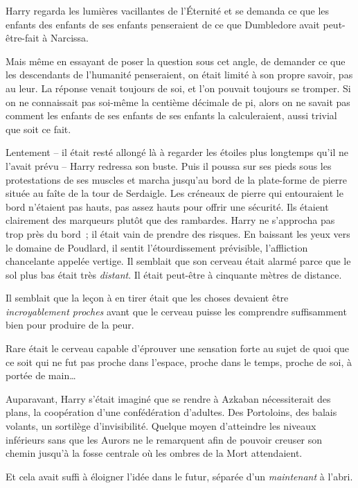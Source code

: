 Harry regarda les lumières vacillantes de l'Éternité et se demanda ce que les enfants des enfants de ses enfants penseraient de ce que Dumbledore avait peut-être-fait à Narcissa.

Mais même en essayant de poser la question sous cet angle, de demander ce que les descendants de l'humanité penseraient, on était limité à son propre savoir, pas au leur. La réponse venait toujours de soi, et l'on pouvait toujours se tromper. Si on ne connaissait pas soi-même la centième décimale de pi, alors on ne savait pas comment les enfants de ses enfants de ses enfants la calculeraient, aussi trivial que soit ce fait.

\later

Lentement -- il était resté allongé là à regarder les étoiles plus longtemps qu'il ne l'avait prévu -- Harry redressa son buste. Puis il poussa sur ses pieds sous les protestations de ses muscles et marcha jusqu'au bord de la plate-forme de pierre située au faîte de la tour de Serdaigle. Les créneaux de pierre qui entouraient le bord n'étaient pas hauts, pas assez hauts pour offrir une sécurité. Ils étaient clairement des marqueurs plutôt que des rambardes. Harry ne s'approcha pas trop près du bord~; il était vain de prendre des risques. En baissant les yeux vers le domaine de Poudlard, il sentit l'étourdissement prévisible, l'affliction chancelante appelée vertige. Il semblait que son cerveau était alarmé parce que le sol plus bas était très \emph{distant}. Il était peut-être à cinquante mètres de distance.

Il semblait que la leçon à en tirer était que les choses devaient être \emph{incroyablement proches} avant que le cerveau puisse les comprendre suffisamment bien pour produire de la peur.

Rare était le cerveau capable d'éprouver une sensation forte au sujet de quoi que ce soit qui ne fut pas proche dans l'espace, proche dans le temps, proche de soi, à portée de main…

Auparavant, Harry s'était imaginé que se rendre à Azkaban nécessiterait des plans, la coopération d'une confédération d'adultes. Des Portoloins, des balais volants, un sortilège d'invisibilité. Quelque moyen d'atteindre les niveaux inférieurs sans que les Aurors ne le remarquent afin de pouvoir creuser son chemin jusqu'à la fosse centrale où les ombres de la Mort attendaient.

Et cela avait suffi à éloigner l'idée dans le futur, séparée d'un \emph{maintenant} à l'abri.

